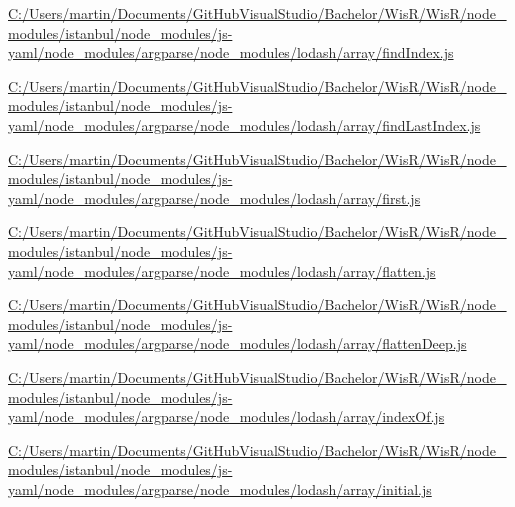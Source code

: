 \begin{DoxyCompactItemize}
\item 
\hyperlink{_c_1_2_users_2martin_2_documents_2_git_hub_visual_studio_2_bachelor_2_wis_r_2_wis_r_2node_module61f79ea4d933261c76d693852ce50516}{C\+:/\+Users/martin/\+Documents/\+Git\+Hub\+Visual\+Studio/\+Bachelor/\+Wis\+R/\+Wis\+R/node\+\_\+modules/istanbul/node\+\_\+modules/js-\/yaml/node\+\_\+modules/argparse/node\+\_\+modules/lodash/array/find\+Index.\+js}
\item 
\hyperlink{_c_1_2_users_2martin_2_documents_2_git_hub_visual_studio_2_bachelor_2_wis_r_2_wis_r_2node_module3b6e297d30ac0d41389c782cfa27340e}{C\+:/\+Users/martin/\+Documents/\+Git\+Hub\+Visual\+Studio/\+Bachelor/\+Wis\+R/\+Wis\+R/node\+\_\+modules/istanbul/node\+\_\+modules/js-\/yaml/node\+\_\+modules/argparse/node\+\_\+modules/lodash/array/find\+Last\+Index.\+js}
\item 
\hyperlink{_c_1_2_users_2martin_2_documents_2_git_hub_visual_studio_2_bachelor_2_wis_r_2_wis_r_2node_module881fdb5322bbff5c59e003b478fd462b}{C\+:/\+Users/martin/\+Documents/\+Git\+Hub\+Visual\+Studio/\+Bachelor/\+Wis\+R/\+Wis\+R/node\+\_\+modules/istanbul/node\+\_\+modules/js-\/yaml/node\+\_\+modules/argparse/node\+\_\+modules/lodash/array/first.\+js}
\item 
\hyperlink{_c_1_2_users_2martin_2_documents_2_git_hub_visual_studio_2_bachelor_2_wis_r_2_wis_r_2node_modulebcb679d9a0fbb16904d2931acf37a35a}{C\+:/\+Users/martin/\+Documents/\+Git\+Hub\+Visual\+Studio/\+Bachelor/\+Wis\+R/\+Wis\+R/node\+\_\+modules/istanbul/node\+\_\+modules/js-\/yaml/node\+\_\+modules/argparse/node\+\_\+modules/lodash/array/flatten.\+js}
\item 
\hyperlink{_c_1_2_users_2martin_2_documents_2_git_hub_visual_studio_2_bachelor_2_wis_r_2_wis_r_2node_module3e59e70229684c451d857477f17417d2}{C\+:/\+Users/martin/\+Documents/\+Git\+Hub\+Visual\+Studio/\+Bachelor/\+Wis\+R/\+Wis\+R/node\+\_\+modules/istanbul/node\+\_\+modules/js-\/yaml/node\+\_\+modules/argparse/node\+\_\+modules/lodash/array/flatten\+Deep.\+js}
\item 
\hyperlink{_c_1_2_users_2martin_2_documents_2_git_hub_visual_studio_2_bachelor_2_wis_r_2_wis_r_2node_module84299fcf888732fa85bd15ea11f7dad9}{C\+:/\+Users/martin/\+Documents/\+Git\+Hub\+Visual\+Studio/\+Bachelor/\+Wis\+R/\+Wis\+R/node\+\_\+modules/istanbul/node\+\_\+modules/js-\/yaml/node\+\_\+modules/argparse/node\+\_\+modules/lodash/array/index\+Of.\+js}
\item 
\hyperlink{_c_1_2_users_2martin_2_documents_2_git_hub_visual_studio_2_bachelor_2_wis_r_2_wis_r_2node_moduleedfc6962c2cbc6d48be622a62069349c}{C\+:/\+Users/martin/\+Documents/\+Git\+Hub\+Visual\+Studio/\+Bachelor/\+Wis\+R/\+Wis\+R/node\+\_\+modules/istanbul/node\+\_\+modules/js-\/yaml/node\+\_\+modules/argparse/node\+\_\+modules/lodash/array/initial.\+js}

\end{DoxyCompactItemize}
